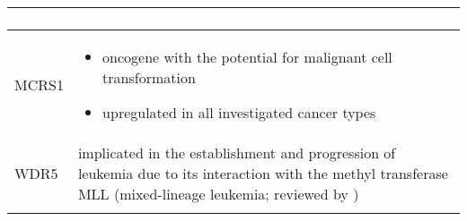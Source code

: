 \begin{minipage}{\textwidth}
\begin{singlespacing}
\begin{small}
\begin{longtable}[l]{>{\textsf\bgroup}p{2cm}<{\egroup} >{\textsf\bgroup}p{12.5cm}<{\egroup}}
\begin{minipage}{12.5cm}
\begin{itemize}[noitemsep, leftmargin=*]
\end{itemize}
\end{minipage}
\tabularnewline \midrule
MCRS1 & \begin{minipage}{12.5cm}
					\begin{itemize}[noitemsep, leftmargin=*]
							\item oncogene with the potential for malignant cell transformation \cite{Okumura2005a,Hsu2012}
							\item upregulated in all investigated cancer types \citep{Shi2012,Wu2012,Lin2013,Zhong2013}
					\end{itemize}
				\end{minipage}
\tabularnewline \midrule
WDR5 & implicated in the establishment and progression of leukemia due to its interaction with the methyl transferase MLL (mixed-lineage leukemia; reviewed by \citet{Wu2011a})
\tabularnewline \bottomrule
\label{tab:cancer}
\end{longtable}
\end{small}
\end{singlespacing}
\end{minipage}

